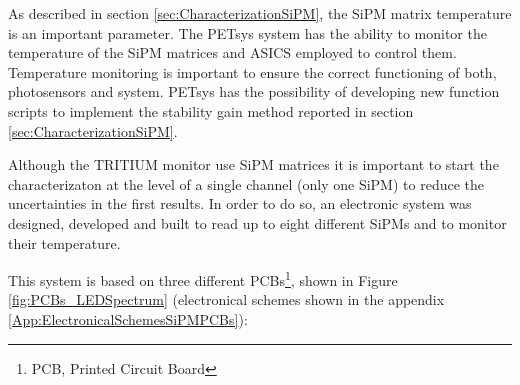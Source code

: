 As described in section \ref{sec:CharacterizationSiPM}, the SiPM matrix temperature is an important parameter. The PETsys system has the ability to monitor the temperature of the SiPM matrices and ASICS employed to control them. Temperature monitoring is important to ensure the correct functioning of both, photosensors and system. PETsys has the possibility of developing new function scripts to implement the stability gain method reported in section \ref{sec:CharacterizationSiPM}.

Although the TRITIUM monitor use SiPM matrices it is important to start the characterizaton at the level of a single channel (only one SiPM) to reduce the uncertainties in the first results. In order to do so, an electronic system was designed, developed and built to read up to eight different SiPMs and to monitor their temperature.

This system is based on three different PCBs\footnote{PCB, Printed Circuit Board}, shown in Figure \ref{fig:PCBs_LEDSpectrum} (electronical schemes shown in the appendix \ref{App:ElectronicalSchemesSiPMPCBs}):

